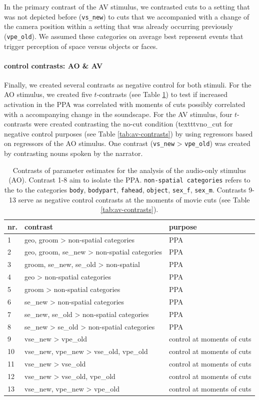 \documentclass[english]{article}
\begin{document}
In the primary contrast of the AV stimulus, we contrasted cuts to a setting that
was not depicted before (\texttt{vs\_new}) to cuts that we accompanied with a
change of the camera position within a setting that was already occurring
previously (\texttt{vpe\_old}).
We assumed these categories on average best represent events that trigger
perception of space versus objects or faces.

\paragraph{control contrasts: AO \& AV}

Finally, we created several contrasts as negative control for both stimuli.
For the AO stimulus, we created five $t$-contrasts (see Table
\ref{tab:ao-contrasts}) to test if increased activation in the PPA was
correlated with moments of cuts possibly correlated with a accompanying change
in the soundscape.
For the AV stimulus, four $t$-contrasts were created contrasting the no-cut
condition (texttt{vno\_cut} for negative control purposes (see Table
\ref{tab:av-contrasts}) by using regressors based on regressors of the AO
stimulus. One contrast (\texttt{vs\_new} > \texttt{vpe\_old})  was created by
contrasting nouns spoken by the narrator.


\begin{table}[h!]
\caption{Contrasts of parameter estimates for the analysis of the audio-only
    stimulus (AO).
    Contrast 1-8 aim to isolate the PPA.
    \texttt{non-spatial categories} refers to the to the categories
    \texttt{body}, \texttt{bodypart}, \texttt{fahead},
    \texttt{object}, \texttt{sex\_f}, \texttt{sex\_m}.
    Contrasts 9-13 serve as negative control contrasts at the moments of movie
    cuts (see Table \ref{tab:av-contrasts}).}
\label{tab:ao-contrasts}
\footnotesize
\begin{tabular}{lll}
\toprule
\textbf{nr.} &  \textbf{contrast} & \textbf{purpose} \\
\midrule
1 & geo, groom > non-spatial categories & PPA \tabularnewline
2 & geo, groom, se\_new > non-spatial categories & PPA \tabularnewline
3 & groom, se\_new, se\_old > non-spatial  & PPA \tabularnewline
4 & geo > non-spatial categories & PPA \tabularnewline
5 & groom > non-spatial categories & PPA \tabularnewline
6 & se\_new > non-spatial categories & PPA \tabularnewline
7 & se\_new, se\_old > non-spatial categories & PPA \tabularnewline
8 & se\_new > se\_old > non-spatial categories & PPA \tabularnewline
9 & vse\_new > vpe\_old & control at moments of cuts \tabularnewline
10 & vse\_new, vpe\_new > vse\_old, vpe\_old & control at moments of cuts \tabularnewline
11 & vse\_new > vse\_old & control at moments of cuts \tabularnewline
12 & vse\_new > vse\_old, vpe\_old & control at moments of cuts \tabularnewline
13 & vse\_new, vpe\_new > vpe\_old & control at moments of cuts \tabularnewline
\end{tabular}
\end{table}
\end{document}
